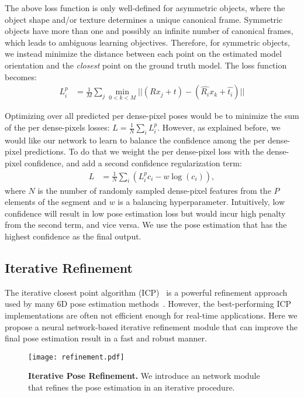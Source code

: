 \documentclass[10pt,twocolumn,letterpaper]{article}
\begin{document}
The above loss function is only well-defined for asymmetric objects, where the object shape and/or texture determines a unique canonical frame. Symmetric objects have more than one and possibly an infinite number of canonical frames, which leads to ambiguous learning objectives. Therefore, for symmetric objects, we instead minimize the distance between each point on the estimated model orientation and the \emph{closest} point on the ground truth model. The loss function becomes:
\begin{align}
L^{p}_{i} &= \frac{1}{M}\sum_{j}\min_{0 < k < M}||(Rx_j + t) - (\hat{R_{i}}x_k + \hat{t_{i}})||
\end{align}

Optimizing over all predicted per dense-pixel poses would be to minimize the sum of the per dense-pixels losses: $L = \frac{1}{N}\sum_{i}L^p_{i}$. However, as explained before, we would like our network to learn to balance the confidence among the per dense-pixel predictions. To do that we weight the per dense-pixel loss with the dense-pixel confidence, and add a second confidence regularization term:
\begin{align}
  \label{eq:confidence}
  L &= \frac{1}{N}\sum_{i}(L^p_{i} c_{i} - w \log(c_{i})),
\end{align}
where $N$ is the number of randomly sampled dense-pixel features from the $P$ elements of the segment and $w$ is a balancing hyperparameter. Intuitively, low confidence will result in low pose estimation loss but would incur high penalty from the second term, and vice versa. We use the pose estimation that has the highest confidence as the final output.

\subsection{Iterative Refinement}
\label{ssec::refine}

The iterative closest point algorithm (ICP)~\cite{Besl1992AMF} is a powerful refinement approach used by many 6D pose estimation methods~\cite{xiang2017posecnn,kehl2017ssd,sundermeyer2018implicit}. However, the best-performing ICP implementations are often not efficient enough for real-time applications. Here we propose a neural network-based iterative refinement module that can improve the final pose estimation result in a fast and robust manner.

\begin{figure}[t!]
	\centering
	\texttt{[image: refinement.pdf]}
	\caption{\textbf{Iterative Pose Refinement.} We introduce an network module that refines the pose estimation in an iterative procedure.}
	\label{fig:refinement}
\end{figure}
\end{document}
